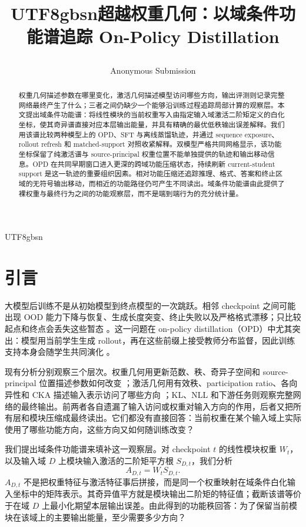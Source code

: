 \documentclass[letterpaper]{article} %
\title{\begin{CJK*}{UTF8}{gbsn}超越权重几何：以域条件功能谱追踪 On-Policy Distillation\end{CJK*}}
\author{Anonymous Submission}
\begin{document}
\maketitle
\begin{CJK*}{UTF8}{gbsn}

\begin{abstract}
权重几何描述参数在哪里变化，激活几何描述模型访问哪些方向，输出评测则记录完整网络最终产生了什么；三者之间仍缺少一个能够沿训练过程追踪局部计算的观察层。本文提出域条件功能谱：将线性模块的当前权重写入由指定输入域激活二阶矩定义的白化坐标，使其奇异谱直接对应本层输出能量，并具有精确的最优低秩输出误差解释。我们用该谱比较两种模型上的 OPD、SFT 与离线蒸馏轨迹，并通过 sequence exposure、rollout refresh 和 matched-support 对照收紧解释。双模型严格共同网格显示，该功能坐标保留了纯激活谱与 source-principal 权重位置不能单独提供的轨迹和输出移动信息。OPD 在共同早期窗口进入更深的跨域功能压缩状态，持续刷新 current-student support 是这一轨迹的重要组织因素。相对功能压缩还追踪推理、格式、答案和终止区域的无符号输出移动，而相近的功能路径仍可产生不同读出。域条件功能谱由此提供了裸权重与最终行为之间的功能观察层，而不是端到端行为的充分统计量。
\end{abstract}

\section{引言}

大模型后训练不是从初始模型到终点模型的一次跳跃。相邻 checkpoint 之间可能出现 OOD 能力下降与恢复、生成长度突变、终止失败以及严格格式漂移；只比较起点和终点会丢失这些暂态 \citep{ren2026rethinking,jin2025rlheals}。这一问题在 on-policy distillation（OPD）中尤其突出：模型用当前学生生成 rollout，再在这些前缀上接受教师分布监督，因此训练支持本身会随学生共同演化 \citep{agarwal2024opd,li2026rethinkingopd}。

现有分析分别观察三个层次。权重几何用更新范数、秩、奇异子空间和 source-principal 位置描述参数如何改变 \citep{shuttleworth2024lora,zhu2025path,yu2026dense,shen2026geometryopd}；激活几何用有效秩、participation ratio、各向异性和 CKA 描述输入表示访问了哪些方向 \citep{liu2026collapse}；KL、NLL 和下游任务则观察完整网络的最终输出。前两者各自遗漏了输入访问或权重对输入方向的作用，后者又把所有层和模块压缩成最终读出。它们都没有直接回答：当前权重在某个输入域上实际使用了哪些功能方向，这些方向又如何随训练改变？

我们提出域条件功能谱来填补这一观察层。对 checkpoint $t$ 的线性模块权重 $W_t$，以及输入域 $D$ 上模块输入激活的二阶矩平方根 $S_{D,t}$，我们分析
\begin{equation}
A_{D,t}=W_tS_{D,t}.
\label{eq:intro-state}
\end{equation}
$A_{D,t}$ 不是把权重特征与激活特征事后拼接，而是同一个权重映射在域条件白化输入坐标中的矩阵表示。其奇异值平方就是模块输出二阶矩的特征值；截断该谱等价于在域 $D$ 上最小化期望本层输出误差。由此得到的功能秩回答：为了保留当前模块在该域上的主要输出能量，至少需要多少方向？


\end{CJK*}
\end{document}
